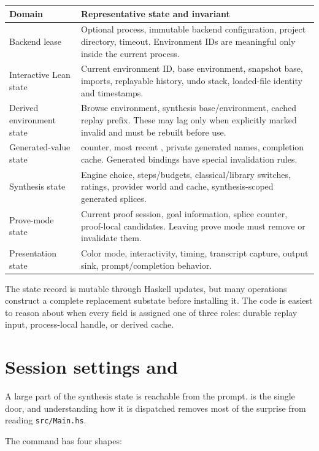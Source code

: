 \documentclass[10pt,letterpaper,oneside]{report}
\newcommand{\code}[1]{\texttt{\detokenize{#1}}}
\newcommand{\filepath}[1]{\nolinkurl{#1}}
\begin{document}
\begin{longtable}{@{}L{0.24\textwidth}L{0.68\textwidth}@{}}
\toprule
\textbf{Domain} & \textbf{Representative state and invariant} \\
\midrule
\endhead
Backend lease & Optional process, immutable backend configuration, project directory, timeout. Environment IDs are meaningful only inside the current process. \\
Interactive Lean state & Current environment ID, base environment, snapshot base, imports, replayable history, undo stack, loaded-file identity and timestamps. \\
Derived environment state & Browse environment, synthesis base/environment, cached replay prefix. These may lag only when explicitly marked invalid and must be rebuilt before use. \\
Generated-value state & \code{it} counter, most recent \code{sorry}, private generated names, completion cache. Generated bindings have special invalidation rules. \\
Synthesis state & Engine choice, steps/budgets, classical/library switches, ratings, provider world and cache, synthesis-scoped generated splices. \\
Prove-mode state & Current proof session, goal information, splice counter, proof-local candidates. Leaving prove mode must remove or invalidate them. \\
Presentation state & Color mode, interactivity, timing, transcript capture, output sink, prompt/completion behavior. \\
\bottomrule
\end{longtable}

The state record is mutable through Haskell updates, but many operations construct a complete replacement substate before installing it. The code is easiest to reason about when every field is assigned one of three roles: durable replay input, process-local handle, or derived cache.

\section{Session settings and \code{:set}}\label{sec:leant-settings}

A large part of the synthesis state is reachable from the prompt. \code{:set} is the single door, and understanding how it is dispatched removes most of the surprise from reading \filepath{src/Main.hs}.

The command has four shapes:
\end{document}
